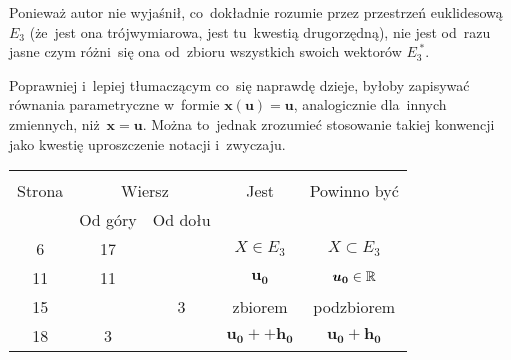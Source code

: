 \documentclass[a4paper,11pt]{article}
\begin{document}


\start {} Ponieważ autor nie wyjaśnił, co~dokładnie rozumie przez
przestrzeń euklidesową $E_{ 3 }$ (że~jest ona trójwymiarowa, jest
tu~kwestią drugorzędną), nie jest od~razu jasne czym różni~się ona
od~zbioru wszystkich swoich wektorów $E_{ 3 }^{ \;* }$.

\vspace{\spaceFour}



\start {} Poprawniej i~lepiej tłumaczącym co~się naprawdę dzieje,
byłoby zapisywać równania parametryczne w~formie
$\boldsymbol{ x( u ) } = \boldsymbol{ u }$, analogicznie dla~innych zmiennych,
niż~$\boldsymbol{ x } = \boldsymbol{ u }$. Można to~jednak zrozumieć stosowanie takiej
konwencji jako kwestię uproszczenie notacji i~zwyczaju.

\vspace{\spaceFour}







\begin{center}

  \begin{tabular}{|c|c|c|c|c|}
    \hline
    & \multicolumn{2}{c|}{} & & \\
    Strona & \multicolumn{2}{c|}{Wiersz} & Jest
                              & Powinno być \\ \cline{2-3}
    & Od góry & Od dołu & & \\
    \hline
    6   & 17 & & $X \in E_{ 3 }$ & $X \subset E_{ 3 }$ \\
    11  & 11 & & $\boldsymbol{u_{ 0 }}$ & $\boldsymbol{u_{ 0 }} \in \mathbb{R}$ \\
    15  & &  3 & zbiorem & podzbiorem \\
    18  &  3 & & $\boldsymbol{u_{ 0 }} + + \boldsymbol{h_{ 0 }}$
           & $\boldsymbol{u_{ 0 }} + \boldsymbol{h_{ 0 }}$ \\
    \hline
  \end{tabular}

\end{center}
\end{document}
